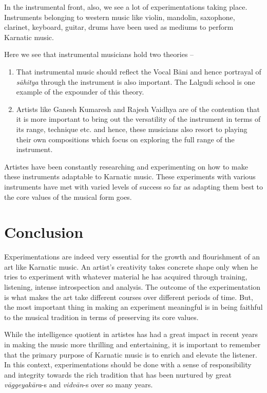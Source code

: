 In the instrumental front, also, we see a lot of experimentations taking place. Instruments belonging to western music like violin, mandolin, saxophone, clarinet, keyboard, guitar, drums have been used as mediums to perform Karnatic music.

Here we see that instrumental musicians hold two theories –

\begin{enumerate}
\itemsep=0pt
\item That instrumental music should reflect the Vocal Bāni and hence portrayal of \textit{sāhitya} through the instrument is also important. The Lalgudi school is one example of the expounder of this theory.

 \item Artists like Ganesh Kumaresh and Rajesh Vaidhya are of the contention that it is more important to bring out the versatility of the instrument in terms of its range, technique etc. and hence, these musicians also resort to playing their own compositions which focus on exploring the full range of the instrument.

\end{enumerate}

Artistes have been constantly researching and experimenting on how to make these instruments adaptable to Karnatic music. These experiments with various instruments have met with varied levels of success so far as adapting them best to the core values of the musical form goes.


\section*{Conclusion}

Experimentations are indeed very essential for the growth and flourishment of an art like Karnatic music. An artist’s creativity takes concrete shape only when he tries to experiment with whatever material he has acquired through training, listening, intense introspection and analysis. The outcome of the experimentation is what makes the art take different courses over different periods of time. But, the most important thing in making an experiment meaningful is in being faithful to the musical tradition in terms of preserving its core values.

While the intelligence quotient in artistes has had a great impact in recent years in making the music more thrilling and entertaining, it is important to remember that the primary purpose of Karnatic music is to enrich and elevate the listener. In this context, experimentations should be done with a sense of responsibility and integrity towards the rich tradition that has been nurtured by great \textit{vāggeyakāra}-s and \textit{vidvān}-s over so many years.

